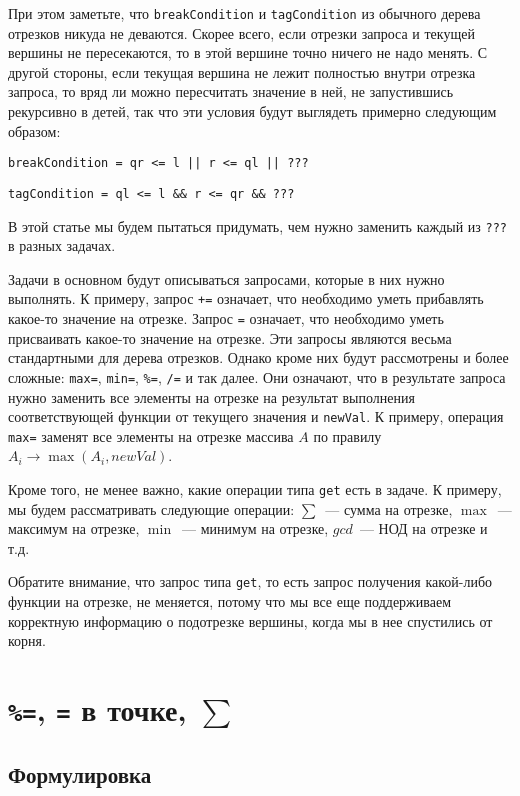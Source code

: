 При этом заметьте, что \verb+breakCondition+ и \verb+tagCondition+ из обычного дерева отрезков никуда не деваются. Скорее всего, если отрезки запроса и текущей вершины не пересекаются, то в этой вершине точно ничего не надо менять. С другой стороны, если текущая вершина не лежит полностью внутри отрезка запроса, то вряд ли можно пересчитать значение в ней, не запустившись рекурсивно в детей, так что эти условия будут выглядеть примерно следующим образом:

\verb+breakCondition = qr <= l || r <= ql || ???+

\verb+tagCondition = ql <= l && r <= qr && ???+

В этой статье мы будем пытаться придумать, чем нужно заменить каждый из \verb+???+ в разных задачах.

Задачи в основном будут описываться запросами, которые в них нужно выполнять. К примеру, запрос \verb^+=^ означает, что необходимо уметь прибавлять какое-то значение на отрезке. Запрос \verb+=+ означает, что необходимо уметь присваивать какое-то значение на отрезке. Эти запросы являются весьма стандартными для дерева отрезков. Однако кроме них будут рассмотрены и более сложные: \verb+max=+, \verb+min=+, \verb+%=+, \verb+/=+ и так далее. Они означают, что в результате запроса нужно заменить все элементы на отрезке на результат выполнения соответствующей функции от текущего значения и \verb+newVal+. К примеру, операция \verb+max=+ заменят все элементы на отрезке массива $A$ по правилу $A_i \to \max(A_i, newVal)$.

Кроме того, не менее важно, какие операции типа \verb+get+ есть в задаче. К примеру, мы будем рассматривать следующие операции: $\sum$~--- сумма на отрезке, $\max$~--- максимум на отрезке, $\min$~--- минимум на отрезке, $gcd$~--- НОД на отрезке и т.д.

\begin{observation}    
Обратите внимание, что запрос типа \verb+get+, то есть запрос получения какой-либо функции на отрезке, не меняется, потому что мы все еще поддерживаем корректную информацию о подотрезке вершины, когда мы в нее спустились от корня.
\end{observation}

\cprotect \section{\verb+%=+, \verb+=+ в точке, $\sum$}\label{perceqpoint}

\subsection{Формулировка}

